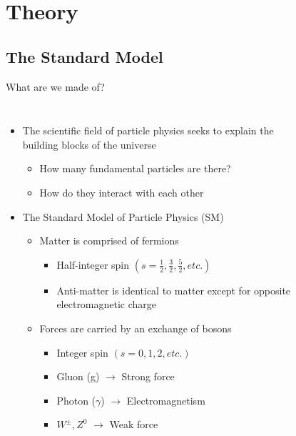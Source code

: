 \documentclass[aspectratio=169,xcolor=table]{beamer}
\begin{document}
\section{Theory }
  
  \subsection{The Standard Model }
  \begin{frame}[t]{What are we made of?}
    \begin{columns}
      \begin{itemize}
        \item The scientific field of particle physics seeks to explain the building blocks of the universe
        \begin{itemize}
          \item How many fundamental particles are there?
          \item How do they interact with each other
        \end{itemize}
        \item The Standard Model of Particle Physics (SM)
        \begin{itemize}
          \item Matter is comprised of fermions
            \begin{itemize}
              \item Half-integer spin $(s=\frac{1}{2},\frac{3}{2},\frac{5}{2},etc.)$
              \item Anti-matter is identical to matter except for opposite electromagnetic charge
            \end{itemize}
          \item Forces are carried by an exchange of bosons
            \begin{itemize}
              \item Integer spin $(s=0,1,2,etc.)$
              \item Gluon (g) $\to$ Strong force
              \item Photon ($\gamma$) $\to$ Electromagnetism
              \item $W^{\pm},Z^{0}$ $\to$ Weak force
            \end{itemize}
        \end{itemize}
      \end{itemize}
      \begin{figure}

\end{figure}
\end{columns}
\end{frame}
\end{document}
